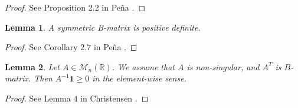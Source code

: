 \documentclass[final,3p,authoryear,12pt]{elsarticle}
\newtheorem{lemma}{Lemma}
\newcommand{\EndAppendix}{}
\begin{document}
\begin{proof}{}
    See Proposition 2.2 in Peña \cite{pena2001class}.
\end{proof}

\begin{lemma}
\label{lemma:BmatrixSPD}
    A symmetric B-matrix is positive definite. 
\end{lemma}

\begin{proof}{}
    See Corollary 2.7 in Peña \cite{pena2001class}. 
\end{proof}

\begin{lemma}
\label{lemma:christensen}
Let $A \in \mathcal{M}_{n}(\mathbb{R})$. We assume that $A$ is non-singular, and $A^{T}$ is  $B$-matrix. Then $A^{-1}\pmb{1} \ge 0$ in the element-wise sense. 
\end{lemma}

\begin{proof}{}
    See Lemma $4$ in Christensen \cite{christensen2019comparative}. 
\end{proof}

\EndAppendix
\end{document}
